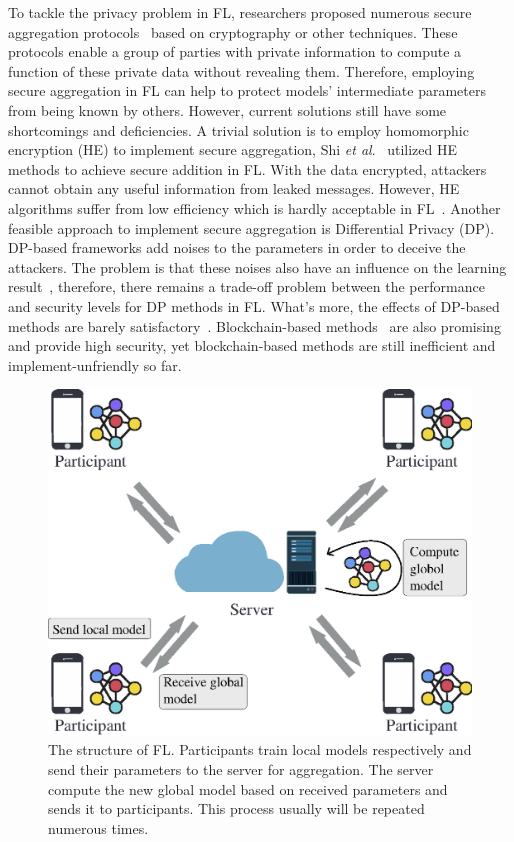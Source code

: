 To tackle the privacy problem in FL, researchers proposed numerous secure aggregation protocols~\cite{shi2011privacy,RobustAgg,Bonawitz19,Nike,PrivFL} based on cryptography or other techniques. These protocols enable a group of parties with private information to compute a function of these private data without revealing them. Therefore, employing secure aggregation in FL can help to protect models' intermediate parameters from being known by others. However, current solutions still have some shortcomings and deficiencies. A trivial solution is to employ homomorphic encryption (HE) to implement secure aggregation, Shi \emph{et al}.~\cite{shi2011privacy} utilized HE methods to achieve secure addition in FL. With the data encrypted, attackers cannot obtain any useful information from leaked messages. However, HE algorithms suffer from low efficiency which is hardly acceptable in FL~\cite{HESurvey}. Another feasible approach to implement secure aggregation is Differential Privacy (DP). DP-based frameworks add noises to the parameters in order to deceive the attackers. The problem is that these noises also have an influence on the learning result~\cite{DLwDP}, therefore, there remains a trade-off problem between the performance and security levels for DP methods in FL. What's more, the effects of DP-based methods are barely satisfactory~\cite{Bargav19}. Blockchain-based methods~\cite{DeepChain,Lu2020,On-Device} are also promising and provide high security, yet blockchain-based methods are still inefficient and implement-unfriendly so far.

\begin{figure}[!ht]
    \centering
    \includegraphics[width=0.9\columnwidth]{img/fed.eps}
    \caption{The structure of FL. Participants train local models respectively and send their parameters to the server for aggregation. The server compute the new global model based on received parameters and sends it to participants. This process usually will be repeated numerous times.}
    \label{fed}
\end{figure}


